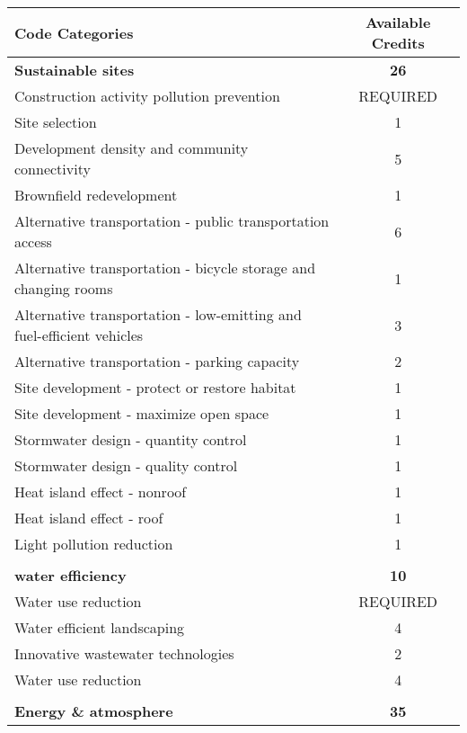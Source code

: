 \documentclass[a4paper,fleqn]{article}
\makeatletter
\newcommand{\ie}{\emph{i.e.,\@\xspace}}
\makeatother
\begin{document}
\begin{longtable}[H]{| l | c |}
	\hline
	\textbf{Code Categories} & \textbf{Available Credits}\\
	
	\hline
	\endhead %
	
	\hline
	\endfoot %
	
	\endlastfoot %
	\textbf{Sustainable sites} & \textbf{26} \\* %
	Construction activity pollution prevention & REQUIRED \\*
	Site selection & 1 \\*
	Development density and community connectivity & 5 \\*
	Brownfield redevelopment & 1 \\*
	Alternative transportation - public transportation access & 6 \\*
	Alternative transportation - bicycle storage and changing rooms & 1 \\*
	Alternative transportation - low-emitting and fuel-efficient vehicles & 3 \\*
	Alternative transportation - parking capacity & 2 \\*
	Site development - protect or restore habitat & 1 \\*
	Site development - maximize open space & 1 \\*
	Stormwater design - quantity control & 1 \\*
	Stormwater design - quality control & 1 \\*
	Heat island effect - nonroof & 1 \\*
	Heat island effect - roof & 1 \\*
	Light pollution reduction & 1 \\*
	& \\
	\textbf{water efficiency}  & \textbf{10} \\*
	Water use reduction & REQUIRED \\*
	Water efficient landscaping & 4 \\*
	Innovative wastewater technologies & 2 \\*
	Water use reduction & 4 \\*
	& \\
	\textbf{Energy \& atmosphere} & \textbf{35} \\*

\end{longtable}
\end{document}

